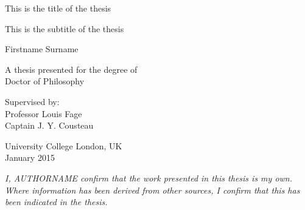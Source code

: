 \documentclass[12pt,a4paper,]{report}
\begin{document}
\begin{titlepage}
    \begin{center}


        \vspace*{2.5cm}

        \huge
        This is the title of the thesis

                \vspace{.5cm}

        \Large
        This is the subtitle of the thesis
        

        \vspace{1.5cm}

        \Large
        Firstname Surname

        \vspace{1.5cm}

        \normalsize
        A thesis presented for the degree of\\
        Doctor of Philosophy

        \vfill

        \normalsize
        Supervised by:\\
        Professor Louis Fage \\ Captain J. Y. Cousteau

        \vspace{0.8cm}


        \normalsize
        University College London, UK\\
        January 2015


    \end{center}
\end{titlepage}

\vspace*{\fill}

\noindent \textit{
I, AUTHORNAME confirm that the work presented in this thesis is my own. Where information has been derived from other sources, I confirm that this has been indicated in the thesis.
} \vspace*{\fill}  \newpage
\end{document}
